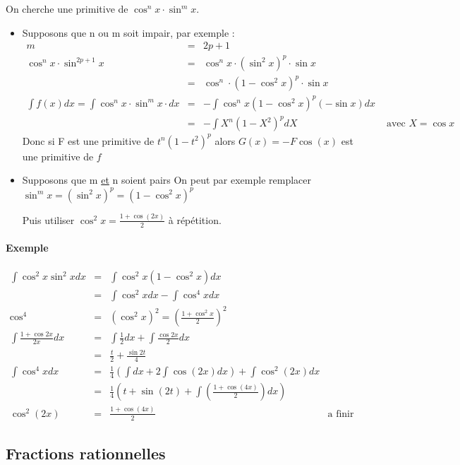 On cherche une primitive de $\cos^nx \cdot \sin^m x$.

\begin{itemize}
	\item Supposons que n ou m soit impair, par exemple : \[\begin{array}{rclr}
			m&=& 2p + 1 \\
\cos^n x \cdot \sin^{2p+1}x &=& \cos^n x \cdot (\sin^2 x)^p \cdot \sin x \\
&=& \cos^n \cdot (1-\cos^2 x)^p \cdot \sin x \\
\int f(x)dx = \int \cos^n x \cdot \sin^m x \cdot dx &=& -\int \cos^n x (1-\cos^2 x)^p (-\sin x) dx \\
&=& - \int X^n (1-X^2)^p dX & \text{ avec } X = \cos x
\end{array}\]
	Donc si F est une primitive de $t^n  (1-t^2)^p$ alors $G(x) = -F \cos(x)$ est une primitive de $f$

	\item Supposons que m \ul{et} n soient pairs
	On peut par exemple remplacer $\sin^m x = (\sin^{2}x)^p = (1-\cos^2 x)^p$

	Puis utiliser $\cos^2 x = \frac{1+\cos(2x)}{2}$ à répétition.

\end{itemize}

\paragraph{Exemple}
	\[\begin{array}{rclr}
		\int \cos^2 x \sin^2 x dx &=& \int \cos^2 x (1-\cos^2 x)dx \\
&=& \int \cos^2 x dx - \int \cos^4 x dx \\
\cos ^4 &=& (\cos^2 x)^2 = (\frac{1+\cos^2 x}{2})^2 \\
\int \frac{1 + \cos 2 x}{2x} dx &=& \int \frac{1}{2} dx + \int \frac{\cos 2x}{2}dx \\
&=& \frac{t}{2} + \frac{\sin 2t}{4} \\
\int \cos^4 x dx &=& \frac{1}{4}(\int dx + 2\int \cos(2x) dx) + \int \cos^2(2x)dx \\
&=& \frac{1}{4}(t + \sin(2t) + \int (\frac{1+\cos(4x)}{2}) dx) \\
\cos^2(2x) &=& \frac{1+\cos(4x)}{2} & \text{a finir } \end{array}\]

\subsection{Fractions rationnelles}

